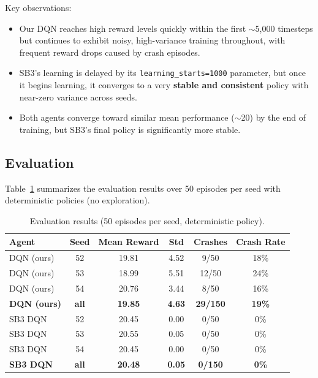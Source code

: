 \documentclass[11pt,a4paper]{article}
\begin{document}
Key observations:
\begin{itemize}
    \item Our DQN reaches high reward levels quickly within the first $\sim$5{,}000 timesteps but continues to exhibit noisy, high-variance training throughout, with frequent reward drops caused by crash episodes.
    \item SB3's learning is delayed by its \texttt{learning\_starts=1000} parameter, but once it begins learning, it converges to a very \textbf{stable and consistent} policy with near-zero variance across seeds.
    \item Both agents converge toward similar mean performance ($\sim$20) by the end of training, but SB3's final policy is significantly more stable.
\end{itemize}

\subsection{Evaluation}

Table~\ref{tab:eval} summarizes the evaluation results over 50 episodes per seed with deterministic policies (no exploration).

\begin{table}[h]
    \centering
    \caption{Evaluation results (50 episodes per seed, deterministic policy).}
    \label{tab:eval}
    \begin{tabular}{lccccc}
        \toprule
        Agent & Seed & Mean Reward & Std & Crashes & Crash Rate \\
        \midrule
        DQN (ours) & 52 & 19.81 & 4.52 & 9/50 & 18\% \\
        DQN (ours) & 53 & 18.99 & 5.51 & 12/50 & 24\% \\
        DQN (ours) & 54 & 20.76 & 3.44 & 8/50 & 16\% \\
        \textbf{DQN (ours)} & \textbf{all} & \textbf{19.85} & \textbf{4.63} & \textbf{29/150} & \textbf{19\%} \\
        \midrule
        SB3 DQN & 52 & 20.45 & 0.00 & 0/50 & 0\% \\
        SB3 DQN & 53 & 20.55 & 0.05 & 0/50 & 0\% \\
        SB3 DQN & 54 & 20.45 & 0.00 & 0/50 & 0\% \\
        \textbf{SB3 DQN} & \textbf{all} & \textbf{20.48} & \textbf{0.05} & \textbf{0/150} & \textbf{0\%} \\
        \bottomrule
    \end{tabular}
\end{table}
\end{document}
